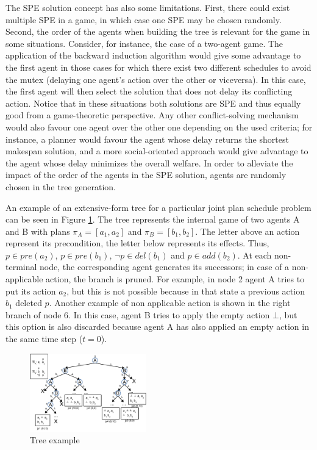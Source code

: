 \documentclass[letterpaper]{article}
\begin{document}
The SPE solution concept has also some limitations. First, there could exist multiple SPE in a game, in which case one SPE may be chosen randomly. Second, the order of the agents when building the tree is relevant for the game in some situations. Consider, for instance, the case of a two-agent game. The application of the backward induction algorithm would give some advantage to the first agent in those cases for which there exist two different schedules to avoid the mutex (delaying one agent's action over the other or viceversa). In this case, the first agent will then select the solution that does not delay its conflicting action. Notice that in these situations both solutions are SPE and thus equally good from a game-theoretic perspective. Any other conflict-solving mechanism would also favour one agent over the other one depending on the used criteria; for instance, a planner would favour the agent whose delay returns the shortest makespan solution, and a more social-oriented approach would give advantage to the agent whose delay minimizes the overall welfare. In order to alleviate the impact of the order of the agents in the SPE solution, agents are randomly chosen in the tree generation.


An example of an extensive-form tree for a particular joint plan schedule problem can be seen in Figure \ref{fig:tree}. The tree represents the internal game of two agents A and B with plans $\pi_A=[a_1, a_2]$ and $\pi_B=[b_1, b_2]$. The letter above an action represent its precondition, the letter below represents its effects. Thus, $p \in pre(a_2)$, $p \in pre(b_1)$, $\neg p \in del(b_1)$ and $p \in add(b_2)$. At each non-terminal node, the corresponding agent generates its successors; in case of a non-applicable action, the branch is pruned. For example, in node 2 agent A tries to put its action $a_2$, but this is not possible because in that state a previous action $b_1$ deleted $p$. Another example of non applicable action is shown in the right branch of node 6. In this case, agent B tries to apply the empty action $\bot$, but this option is also discarded because agent A has also applied an empty action in the same time step ($t=0$).


\begin{figure}
    \centering
    \includegraphics[width=0.45\textwidth]{tree}
    \caption{Tree example}
    \label{fig:tree}
\end{figure}
\end{document}
